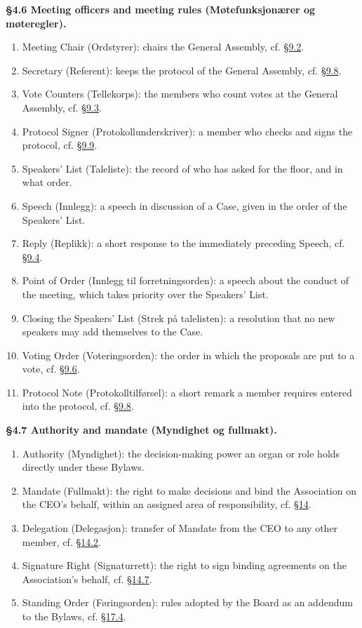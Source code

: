 \documentclass{../../../Common/Latex/Templates/rapport}
\begin{document}
\textbf{\S 4.6 Meeting officers and meeting rules (Møtefunksjonærer og møteregler).}\label{bylaw:4.6}
\begin{enumerate}
  \item Meeting Chair (Ordstyrer): chairs the General Assembly, cf. \hyperref[bylaw:9.2]{\S 9.2}.
  \item Secretary (Referent): keeps the protocol of the General Assembly, cf. \hyperref[bylaw:9.8]{\S 9.8}.
  \item Vote Counters (Tellekorps): the members who count votes at the General Assembly, cf. \hyperref[bylaw:9.3]{\S 9.3}.
  \item Protocol Signer (Protokollunderskriver): a member who checks and signs the protocol, cf. \hyperref[bylaw:9.9]{\S 9.9}.
  \item Speakers' List (Taleliste): the record of who has asked for the floor, and in what order.
  \item Speech (Innlegg): a speech in discussion of a Case, given in the order of the Speakers' List.
  \item Reply (Replikk): a short response to the immediately preceding Speech, cf. \hyperref[bylaw:9.4]{\S 9.4}.
  \item Point of Order (Innlegg til forretningsorden): a speech about the conduct of the meeting, which takes priority over the Speakers' List.
  \item Closing the Speakers' List (Strek på talelisten): a resolution that no new speakers may add themselves to the Case.
  \item Voting Order (Voteringsorden): the order in which the proposals are put to a vote, cf. \hyperref[bylaw:9.6]{\S 9.6}.
  \item Protocol Note (Protokolltilførsel): a short remark a member requires entered into the protocol, cf. \hyperref[bylaw:9.8]{\S 9.8}.
\end{enumerate}

\textbf{\S 4.7 Authority and mandate (Myndighet og fullmakt).}\label{bylaw:4.7}
\begin{enumerate}
  \item Authority (Myndighet): the decision-making power an organ or role holds directly under these Bylaws.
  \item Mandate (Fullmakt): the right to make decisions and bind the Association on the CEO's behalf, within an assigned area of responsibility, cf. \hyperref[bylaw:14]{\S 14}.
  \item Delegation (Delegasjon): transfer of Mandate from the CEO to any other member, cf. \hyperref[bylaw:14.2]{\S 14.2}.
  \item Signature Right (Signaturrett): the right to sign binding agreements on the Association's behalf, cf. \hyperref[bylaw:14.7]{\S 14.7}.
  \item Standing Order (Føringsorden): rules adopted by the Board as an addendum to the Bylaws, cf. \hyperref[bylaw:17.4]{\S 17.4}.
\end{enumerate}
\end{document}
